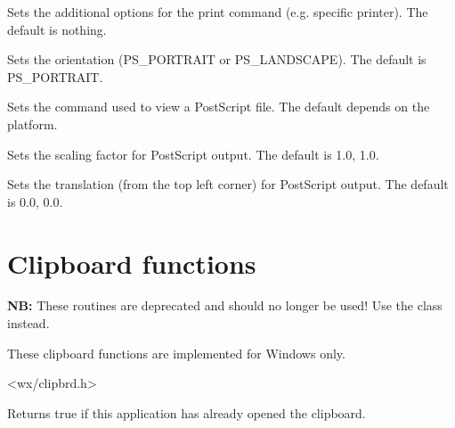 Sets the additional options for the print command (e.g. specific printer). The default is nothing.


\label{wxsetprinterorientation}


Sets the orientation (PS\_PORTRAIT or PS\_LANDSCAPE). The default is PS\_PORTRAIT.


\label{wxsetprinterpreviewcommand}


Sets the command used to view a PostScript file. The default depends on the platform.


\label{wxsetprinterscaling}


Sets the scaling factor for PostScript output. The default is 1.0, 1.0.


\label{wxsetprintertranslation}


Sets the translation (from the top left corner) for PostScript output. The default is 0.0, 0.0.



\section{Clipboard functions}\label{clipsboard}


{\bf NB:} These routines are deprecated and should no longer be used!
Use the  class instead.

These clipboard functions are implemented for Windows only. 



<wx/clipbrd.h>


\label{functionwxclipboardopen}


Returns true if this application has already opened the clipboard.


\label{wxcloseclipboard}

